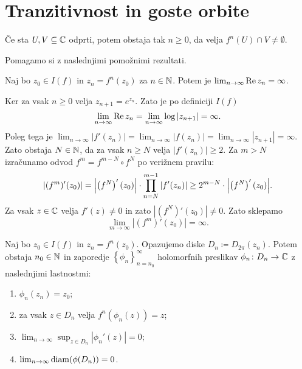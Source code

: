 \section{Tranzitivnost in goste orbite}

\begin{izrek} \label{thm:transitivity}
    Če sta \(U, V \subseteq \mathbb C\) odprti, potem obstaja tak \(n \geq 0\), da velja \(f^{n} (U) \cap V \neq \emptyset\).
\end{izrek}

\noindent Pomagamo si z naslednjimi pomožnimi rezultati.

\begin{trditev}
    Naj bo \(z_0 \in I (f)\) in \(z_n = f^n (z_0)\) za \(n \in \mathbb N\). Potem je \(\lim_{n \to \infty} \operatorname{Re} z_n = \infty\).
\end{trditev}

\begin{dokaz}
    Ker za vsak \(n \geq 0\) velja \(z_{n + 1} = e^{z_n}\). Zato je po definiciji \(I (f)\)
    \[\lim_{n \to \infty} \operatorname{Re} z_n = \lim_{n \to \infty} \log |z_{n + 1}| = \infty.\]
    Poleg tega je \(\lim_{n \to \infty} |f' (z_n)| = \lim_{n \to \infty} |f (z_n)| = \lim_{n \to \infty} |z_{n + 1}| = \infty\). Zato obstaja \(N \in \mathbb N\), da za vsak \(n \geq N\) velja \(|f' (z_n)| \geq 2\). Za \(m > N\) izračunamo odvod \(f^{m} = f^{m - N} \circ f^{N}\) po verižnem pravilu:
    \[|(f^{m})' (z_0)| = \abs{ \prt{f^{N}}' (z_0) } \cdot \prod_{n = N}^{m - 1} |f' (z_n)| \geq 2^{m - N} \cdot \abs{ \prt{f^{N}}' (z_0) }.\]
    Za vsak \(z \in \mathbb C\) velja \(f' (z) \neq 0\) in zato \(|(f^N)' (z_0)| \neq 0\). Zato sklepamo
    \[\lim_{m \to \infty} |(f^{m})' (z_0)| = \infty.\]
\end{dokaz}

\begin{trditev} \label{prop:small_disks}
    Naj bo \(z_0 \in I (f)\) in \(z_n = f^{n} (z_0)\). Opazujemo diske \(D_n \coloneq D_{2 \pi} (z_n)\). Potem obstaja \(n_0 \in \mathbb N\) in zaporedje \(\left\{ \phi_n \right\}_{n = n_0}^{\infty}\) holomorfnih preslikav \(\phi_n \colon D_n \to \mathbb C\) z naslednjimi lastnostmi:
    \begin{enumerate}
        \item \label{item:ena} \(\phi_n (z_n) = z_0\);
        \item \label{item:dva} za vsak \(z \in D_n\) velja \(f^n (\phi_n (z)) = z\);
        \item \label{item:tri} \(\lim_{n \to \infty} \sup_{z \in D_n} |\phi_n' (z)| = 0\);
        \item \label{item:stiri} \(\lim_{n \to \infty} \operatorname{diam} (\phi (D_n)) = 0\).
    \end{enumerate}
\end{trditev}

